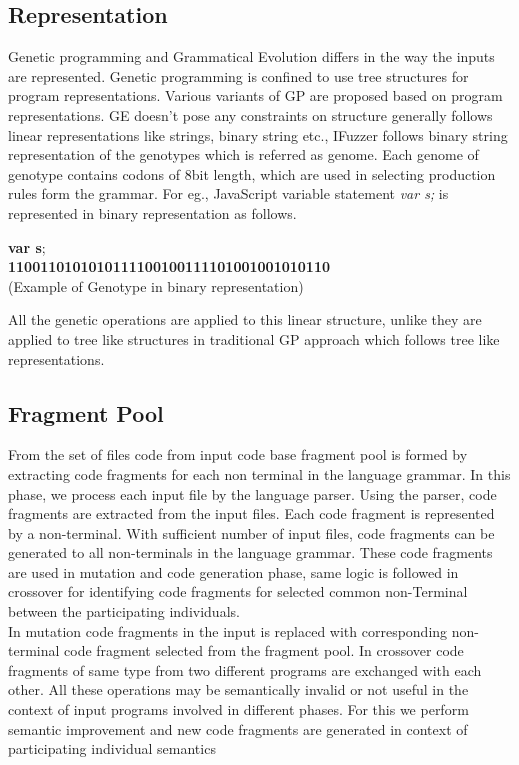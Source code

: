 \documentclass{acm_proc_article-sp}
\begin{document}
\subsection{Representation}
Genetic programming and Grammatical Evolution differs in the way the inputs are represented. Genetic programming is confined to use tree structures for program representations. Various variants of GP are proposed based on program representations. GE doesn't pose any constraints on structure generally follows linear representations like strings, binary string etc., IFuzzer follows binary string representation of the genotypes \cite{Hugosson10} which is referred as genome. Each genome of genotype contains codons of 8bit length, which are used in selecting production rules form the grammar. For eg., JavaScript variable statement \textit{var s;} is represented in binary representation as follows.
\begin{center}
\textbf{var s};\\
\textbf{1100110101010111100100111101001001010110}\\
{\small (Example of Genotype in binary representation)}
\end{center}

\indent All the genetic operations are applied to this linear structure, unlike they are applied to tree like structures in traditional GP approach which follows tree like representations.
\subsection{Fragment Pool}
From the set of files code from input code base fragment pool is formed by extracting code fragments for each non terminal in the language grammar. In this phase, we process each input file by the language parser. Using the parser, code fragments are extracted from the input files. Each code fragment is represented by a non-terminal. With sufficient number of input files, code fragments can be generated to all non-terminals in the language grammar. These code fragments are used in mutation and code generation phase, same logic is followed in crossover for identifying code fragments for selected common non-Terminal between the participating individuals. \\
\indent In mutation code fragments in the input is replaced with corresponding non-terminal code fragment selected from the fragment pool. In crossover code fragments of same type from two different programs are exchanged with each other. All these operations may be semantically invalid  or not useful in the context of input programs involved in different phases. For this we perform semantic improvement and new code fragments are generated in context of participating individual semantics
\end{document}

